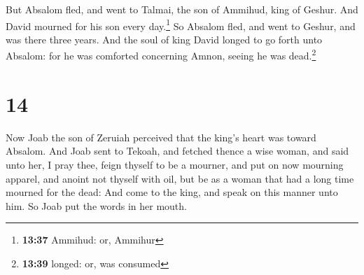  But Absalom fled, and went to Talmai, the son of
Ammihud, king of Geshur. And David mourned for his son every
day.\footnote{\textbf{13:37} Ammihud: or, Ammihur}  So
Absalom fled, and went to Geshur, and was there three years.
 And the soul of king David longed to go forth unto
Absalom: for he was comforted concerning Amnon, seeing he was
dead.\footnote{\textbf{13:39} longed: or, was consumed}

\hypertarget{section-13}{%
\section{14}\label{section-13}}

 Now Joab the son of Zeruiah perceived that the king's
heart was toward Absalom.  And Joab sent to Tekoah, and
fetched thence a wise woman, and said unto her, I pray thee, feign
thyself to be a mourner, and put on now mourning apparel, and anoint not
thyself with oil, but be as a woman that had a long time mourned for the
dead:  And come to the king, and speak on this manner unto
him. So Joab put the words in her mouth.

